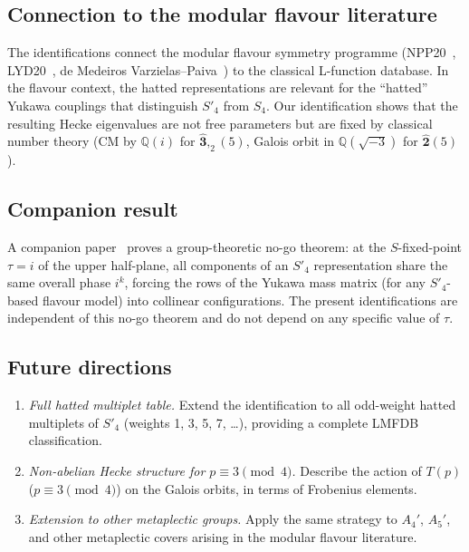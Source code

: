 \documentclass[12pt]{amsart}
\theoremstyle{definition}
\newcommand{\Q}{\mathbb{Q}}
\newcommand{\hhat}[1]{\widehat{\mathbf{#1}}}  %
\begin{document}
\subsection{Connection to the modular flavour literature}

The identifications connect the modular flavour symmetry programme
(NPP20~\cite{NPP20}, LYD20~\cite{LYD20},
de Medeiros Varzielas--Paiva~\cite{dMVP26})
to the classical L-function database.  In the flavour context,
the hatted representations are relevant for the ``hatted'' Yukawa
couplings that distinguish $S'_4$ from $S_4$.
Our identification shows that the resulting Hecke eigenvalues
are not free parameters but are fixed by classical number theory
(CM by $\Q(i)$ for $\hhat{3},_2(5)$, Galois orbit in $\Q(\sqrt{-3})$
for $\hhat{2}(5)$).

\subsection{Companion result}

A companion paper~\cite{V2_no_go} proves a group-theoretic no-go
theorem: at the $S$-fixed-point $\tau=i$ of the upper half-plane,
all components of an $S'_4$ representation share the same overall
phase $i^k$, forcing the rows of the Yukawa mass matrix
(for any $S'_4$-based flavour model) into collinear configurations.
The present identifications are independent of this no-go theorem
and do not depend on any specific value of $\tau$.

\subsection{Future directions}

\begin{enumerate}
  \item \emph{Full hatted multiplet table.}  Extend the identification
    to all odd-weight hatted multiplets of $S'_4$ (weights 1, 3, 5, 7, \ldots),
    providing a complete LMFDB classification.
  \item \emph{Non-abelian Hecke structure for $p\equiv 3\pmod{4}$.}
    Describe the action of $T(p)$ ($p\equiv 3\pmod{4}$) on the Galois
    orbits, in terms of Frobenius elements.
  \item \emph{Extension to other metaplectic groups.}  Apply the
    same strategy to $A_4'$, $A_5'$, and other metaplectic covers
    arising in the modular flavour literature.
\end{enumerate}
\end{document}
